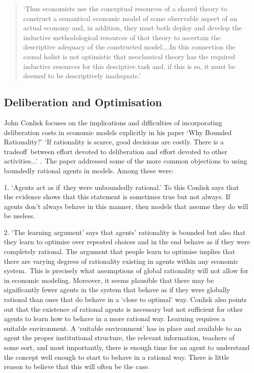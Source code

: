 \documentclass{ucthesis}
\begin{document}
\begin{quotation}
`Thus economists use the conceptual resources of a shared theory to
construct a semantical economic model of some observable aspect of an actual
economy and, in addition, they must both deploy and develop the inductive
methodological resources of that theory to ascertain the descriptive
adequacy of the constructed model....In this connection the causal holist is
not optimistic that neoclassical theory has the required inductive resources
for this desciptive task and, if this is so, it must be deemed to be
descriptively inadequate.'\cite[pp. 208-210]{Boylan}
\end{quotation}

\subsection{Deliberation and Optimisation}

John Conlisk \cite[1996]{conlisk} focuses on the implications and
difficulties of incorporating deliberation costs in economic models
explicitly in his paper `Why Bounded Rationality?' `If rationality is
scarce, good decisions are costly. There is a tradeoff\textit{\ }between
effort devoted to deliberation and effort devoted to other activities...' 
\cite[pp. 682]{conlisk}.\textit{\ }The paper addressed some of the more
common objections to using boundedly rational agents in models. Among these
were:

1. `Agents act as if\ they were unboundedly rational.' To this Conlisk says
that the evidence shows that this statement is sometimes true but not
always. If agents don't always behave in this manner, then models that
assume they do will be useless.

2. `The learning argument' says that agents' rationality is bounded but also
that they learn to optimise over repeated choices and in the end behave as
if they were completely rational. The argument that people learn to optimise
implies that there are varying degrees of rationality existing in agents
within any economic system.\ This is precisely what assumptions of global
rationality will not allow for in economic modeling. Moreover, it seems
plausible that there may be significantly fewer agents in the system that
behave as if they were globally rational than ones that do behave in a
`close to optimal' way. Conlisk also points out that the existence of
rational agents is necessary but not sufficient for other agents to learn
how to behave in a more rational way. Learning requires a suitable
environment. A `suitable environment' has in place and available to an agent
the proper institutional structure, the relevant information, teachers of
some sort, and most importantly, there is enough time for an agent to
understand the concept well enough to start to behave in a rational way.
There is little reason to believe that this will often be the case.
\end{document}
